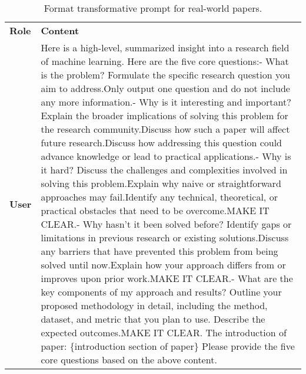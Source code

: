 \begin{table*}[ht]
\centering
\footnotesize
\renewcommand{\arraystretch}{1.3}
\begin{tabular}{p{1cm}p{11.5cm}}
\toprule[1.5pt]
\textbf{Role} & \textbf{Content} \\ 
\cmidrule[0.5pt](lr){1-2}
\textbf{User} &  Here is a high-level, summarized insight into a research field of machine learning.\newline
Here are the five core questions:\newline
[Question 1] - What is the problem?\newline
Formulate the specific research question you aim to address.\newline Only output one question and do not include any more information.\newline
[Question 2] - Why is it interesting and important?\newline
Explain the broader implications of solving this problem for the research community.\newline Discuss how such a paper will affect future research.\newline Discuss how addressing this question could advance knowledge or lead to practical applications.\newline
[Question 3] - Why is it hard?\newline
Discuss the challenges and complexities involved in solving this problem.\newline Explain why naive or straightforward approaches may fail.\newline Identify any technical, theoretical, or practical obstacles that need to be overcome.\newline MAKE IT CLEAR.\newline
[Question 4] - Why hasn't it been solved before?\newline
Identify gaps or limitations in previous research or existing solutions.\newline Discuss any barriers that have prevented this problem from being solved until now.\newline Explain how your approach differs from or improves upon prior work.\newline MAKE IT CLEAR.\newline
[Question 5] - What are the key components of my approach and results?\newline
Outline your proposed methodology in detail, including the method, dataset, and metric that you plan to use. Describe the expected outcomes.\newline MAKE IT CLEAR.\newline
The introduction of paper:\newline
\{introduction section of paper\}\newline
Please provide the five core questions based on the above content.\\
\bottomrule[1.5pt]
\end{tabular}
\caption{Format transformative prompt for real-world papers.}
\label{tab:Paper_Ground_Truth_Transform}
\end{table*}

